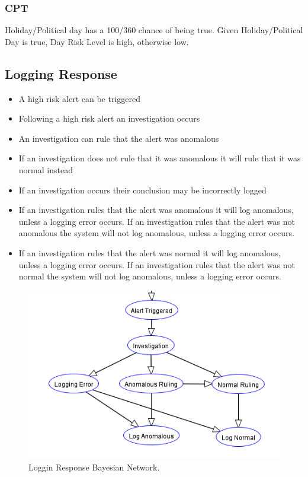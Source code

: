 \documentclass[10pt,a4paper]{article}
\begin{document}
\subsubsection{CPT}

Holiday/Political day has a 100/360 chance of being true. Given Holiday/Political Day is true, Day Risk Level is high, otherwise low.

\subsection{Logging Response}

\begin{itemize}
\item A high risk alert can be triggered
\item Following a high risk alert an investigation occurs
\item An investigation can rule that the alert was anomalous
\item If an investigation does not rule that it was anomalous it will rule that it was normal instead
\item If an investigation occurs their conclusion may be incorrectly logged
\item If an investigation rules that the alert was anomalous it will log anomalous, unless a logging error occurs. If an investigation rules that the alert was not anomalous the system will not log anomalous, unless a logging error occurs.
\item If an investigation rules that the alert was normal it will log anomalous, unless a logging error occurs. If an investigation rules that the alert was not normal the system will not log anomalous, unless a logging error occurs.
\end{itemize}

\begin{figure}
\centering
  \includegraphics{logging_network.png}
  \caption{Loggin Response Bayesian Network.}
  \label{fig:logging_network}
\end{figure}
\end{document}
